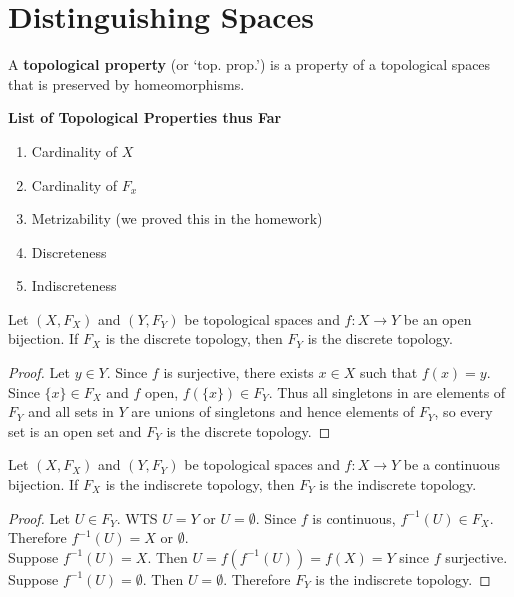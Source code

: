 

\chapter{Distinguishing Spaces} 
\begin{definition}
	A \textbf{topological property} (or `top. prop.') is a property of a topological spaces that is preserved by homeomorphisms. 
\end{definition}
\begin{center}
	\textbf{List of Topological Properties thus Far} 
\end{center}
\begin{enumerate}
	\item Cardinality of $X$ 
	\item Cardinality of $F_x$ 
	\item Metrizability (we proved this in the homework) 
	\item Discreteness 
	\item Indiscreteness 
\end{enumerate}
\begin{lemma}
	 Let $(X, F_X) $ and $(Y, F_Y)$ be topological spaces and $f: X \rightarrow Y$ be an open bijection. If $F_X$ is the discrete topology, then $F_Y$ is the discrete topology. 
\end{lemma}
\begin{proof}
	Let $y \in Y$. Since $f$ is surjective, there exists $x \in X$ such that $f(x) = y$. Since $\{x\} \in F_X$ and $f$ open, $f(\{x\}) \in F_Y$. Thus all singletons in are elements of $F_Y$ and all sets in $Y$ are unions of singletons and hence elements of $F_Y$, so every set is an open set and $F_Y$ is the discrete topology. 
\end{proof}
\begin{lemma}
	 Let $(X, F_X) $ and $(Y, F_Y)$ be topological spaces and $f: X \rightarrow Y$ be a continuous bijection. If $F_X$ is the indiscrete topology, then $F_Y$ is the indiscrete topology. 
\end{lemma}
\begin{proof}
	Let $U \in F_Y$. WTS $U = Y$ or $U = \emptyset$. Since $f$ is continuous, $f^{-1}(U) \in F_X$. Therefore $f^{-1}(U) = X$ or $\emptyset$. \\
	Suppose $f^{-1}(U) = X$. Then $U = f(f^{-1}(U)) = f(X) = Y$ since $f$ surjective.\\
	Suppose $f^{-1}(U) = \emptyset$. Then $U = \emptyset$. Therefore $F_Y$ is the indiscrete topology. 
\end{proof}


